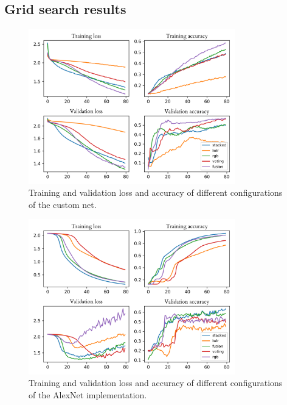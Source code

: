 \documentclass{l4proj}
\begin{document}
\begin{appendices}

\chapter{Grid search results}
\label{appendix_grid_search}

\begin{figure}[ht]
  \centering
  \includegraphics[width=0.8\textwidth]{images/evaluation/gridsearch/customnet.png}
  \caption{Training and validation loss and accuracy of different configurations of the custom net.}
  \label{fig:customnet_configs}
\end{figure}

\begin{figure}[ht]
  \centering
  \includegraphics[width=0.8\textwidth]{images/evaluation/gridsearch/alexnet.png}
  \caption{Training and validation loss and accuracy of different configurations of the AlexNet implementation.}
  \label{fig:alexnet_configs}
\end{figure}


\end{appendices}
\end{document}

